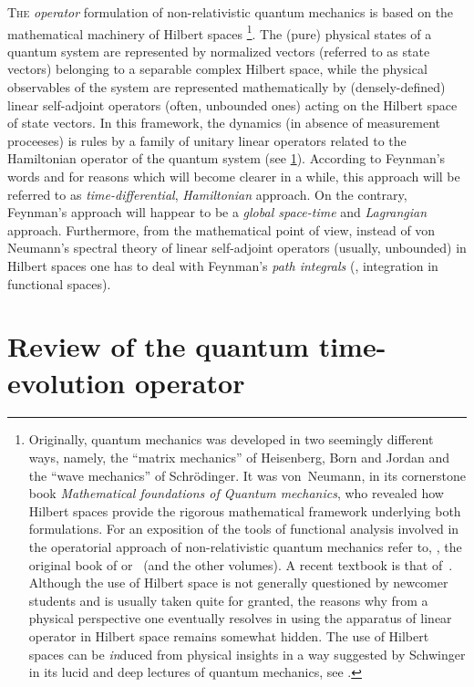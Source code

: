 \lettrine{T}{he} \emph{operator} formulation of non-relativistic quantum
mechanics is based on the mathematical machinery of 
Hilbert spaces%
\footnote{%
   Originally, quantum mechanics was developed in two seemingly different ways,
   namely, the ``matrix mechanics'' of Heisenberg, Born and Jordan and the
   ``wave mechanics'' of Schr\"odinger. It was von~Neumann, in its cornerstone
   book \emph{Mathematical foundations of Quantum mechanics}, who revealed
   how
   Hilbert spaces provide the rigorous mathematical 
   framework underlying both formulations. For an exposition of the 
   tools of functional analysis involved in the operatorial approach of
   non-relativistic quantum mechanics refer to,
   \eg, the original book of \textcite{Neumann:1955} or~\textcite{Reed.Simon:1980}
   (and the other volumes). A recent textbook is that of~\textcite{Teschl:2009}.
   Although the use of Hilbert space is not generally questioned by newcomer
   students
   and is usually taken quite for granted, the reasons why from a physical perspective 
   one eventually resolves in using the apparatus of linear operator in Hilbert space remains
   somewhat
   hidden.
   The use of Hilbert spaces can be \emph{in}duced from physical insights
   in a way suggested by
 Schwinger in its 
 lucid and deep lectures of quantum mechanics, see \textcite{Schwinger:2001}.}.
The (pure) physical states of a quantum system are represented by normalized
vectors (referred to as state vectors) belonging to a separable
 complex Hilbert
space, while the physical observables of the system are represented mathematically by
(densely-defined) linear self-adjoint operators (often, unbounded ones) acting
on the Hilbert space of state vectors. In this framework,
the dynamics (in absence of measurement proceeses) is rules by a family of unitary linear operators related to the
Hamiltonian operator of the quantum system (see \cref{chap:evolution}).
According to Feynman's words and for reasons which will become clearer in a
while, this approach will be referred to as \emph{time-differential},
\emph{Hamiltonian} approach. On the contrary, Feynman's approach will happear to
be a \emph{global space-time} and \emph{Lagrangian} approach. Furthermore, from the
mathematical point of view, instead of von Neumann's spectral theory of linear
self-adjoint operators (usually, unbounded) in Hilbert spaces one has to deal with
Feynman's \emph{path integrals} (\ie, integration in functional spaces).

\section{Review of the quantum time-evolution operator}
\label{chap:evolution}

